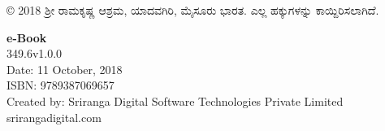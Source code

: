 \thispagestyle{empty}

© 2018 ಶ‍್ರೀ ರಾಮಕೃಷ್ಣ ಆಶ್ರಮ, ಯಾದವಗಿರಿ, ಮೈಸೂರು ಭಾರತ. ಎಲ್ಲ ಹಕ್ಕುಗಳನ್ನು ಕಾಯ್ದಿರಿಸಲಾಗಿದೆ.

 \textbf{e-Book}\\
 349.6v1.0.0\\
 Date: 11 October, 2018\\
 ISBN: 9789387069657\\
 Created by: Sriranga Digital Software Technologies Private Limited\\srirangadigital.com

